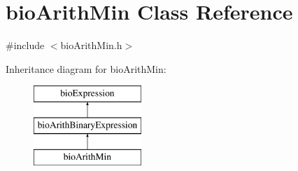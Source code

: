 \hypertarget{classbio_arith_min}{}\section{bio\+Arith\+Min Class Reference}
\label{classbio_arith_min}


{\ttfamily \#include $<$bio\+Arith\+Min.\+h$>$}

Inheritance diagram for bio\+Arith\+Min\+:\begin{figure}[H]
\begin{center}
\leavevmode
\includegraphics[height=3.000000cm]{classbio_arith_min}
\end{center}
\end{figure}
